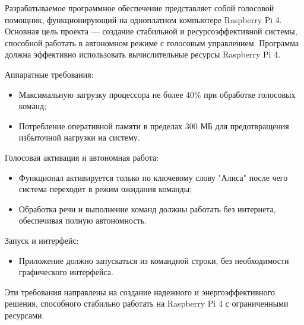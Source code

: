 Разрабатываемое программное обеспечение представляет собой голосовой помощник, функционирующий на одноплатном компьютере Raspberry Pi 4.
Основная цель проекта — создание стабильной и ресурсоэффективной системы, способной работать в автономном режиме с голосовым управлением.
Программа должна эффективно использовать вычислительные ресурсы Raspberry Pi 4.

Аппаратные требования:
\begin{itemize}
	\item Максимальную загрузку процессора не более 40\% при обработке голосовых команд;
	\item Потребление оперативной памяти в пределах 300 МБ для предотвращения избыточной нагрузки на систему.
\end{itemize}

Голосовая активация и автономная работа:
\begin{itemize}
	\item Функционал активируется только по ключевому слову "Алиса" после чего система переходит в режим ожидания команды;
	\item Обработка речи и выполнение команд должны работать без интернета, обеспечивая полную автономность.
\end{itemize}

Запуск и интерфейс:
\begin{itemize}
	\item Приложение должно запускаться из командной строки, без необходимости графического интерфейса.
\end{itemize}

Эти требования направлены на создание надежного и энергоэффективного решения, способного стабильно работать на Raspberry Pi 4 с ограниченными ресурсами.
\newpage
